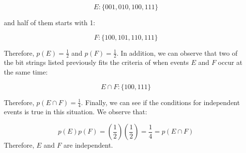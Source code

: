 \documentclass[11pt]{article}
\begin{document}
\[E: \{001, 010, 100, 111\}\]

and half of them starts with 1:

\[F: \{100, 101, 110, 111\}\]

Therefore, $p(E) = \frac{1}{2}$ and $p(F) = \frac{1}{2}$. In addition, we can observe that two of the bit strings listed previously fits the criteria of when events $E$ and $F$ occur at the same time:

\[E \cap F : \{100, 111\}\]

Therefore, $p(E \cap F) = \frac{1}{4}$. Finally, we can see if the conditions for independent events is true in this situation. We observe that:

\[p(E)p(F) = \left(\frac{1}{2}\right)\left(\frac{1}{2}\right) = \frac{1}{4} = p(E \cap F)\]
Therefore, $E$ and $F$ are independent.
\end{document}
